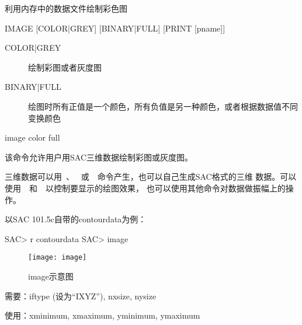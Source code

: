 \label{cmd:image}

利用内存中的数据文件绘制彩色图

\begin{SACSTX}
IMAGE [COLOR|GREY] [BINARY|FULL] [PRINT [pname]]
\end{SACSTX}

\begin{description}
\item [COLOR|GREY] 绘制彩图或者灰度图
\item [BINARY|FULL] 绘图时所有正值是一个颜色，所有负值是另一种颜色，或者根据数据值不同变换颜色
\end{description}

\begin{SACDFT}
image color full
\end{SACDFT}

该命令允许用户用SAC三维数据绘制彩图或灰度图。

三维数据可以用~、
~或~~命令产生，也可以自己生成SAC格式的三维
数据。可以使用~~和~~以控制要显示的绘图效果，
也可以使用其他命令对数据做振幅上的操作。

以SAC 101.5c自带的contourdata为例：
\begin{SACCode}
SAC> r contourdata
SAC> image
\end{SACCode}

\begin{figure}[!ht]
\centering
\texttt{[image: image]}
\caption{image示意图}
\end{figure}

需要：iftype (设为``IXYZ''), nxsize, nysize

使用：xminimum, xmaximum, yminimum, ymaximum
